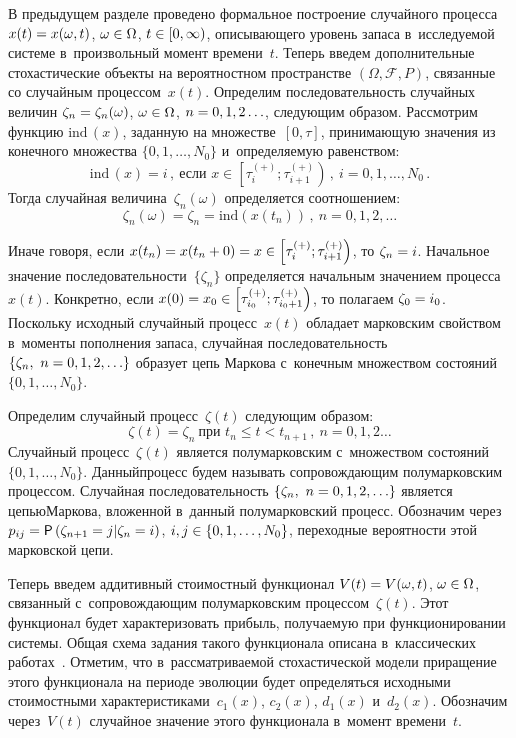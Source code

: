 \begin{multicols}{2}
  В предыдущем разделе проведено формальное построение случайного 
процесса $x(t)\hm= x(\omega, t)$, $\omega\hm\in \Omega$, $t\hm\in [0,\infty)$, 
описывающего уровень запаса в~исследуемой системе в~произвольный момент 
времени~$t$. Теперь введем дополнительные стохастические объекты на 
вероятностном пространстве $(\Omega, \mathcal{F}, P)$, связанные со 
случайным процессом~$x(t)$. Определим последовательность случайных 
величин $\zeta_n\hm= \zeta_n(\omega)$, $\omega\hm\in \Omega$, 
$n\hm=0,1,2\ldots$, следующим образом. Рассмотрим функцию $\mathrm{ind}\,(x)$, 
заданную на множестве~$[0,\tau]$, принимающую значения из конечного 
множества $\{0,1,\ldots ,N_0\}$ и~определяемую равенством:
  $$
  \mathrm{ind}\,(x) =i\,,\ \mbox{если } x\in \left[ \tau_i^{(+)}; 
  \tau_{i+1}^{(+)}\right)\,,\ i=0,1,\ldots, 
N_0\,.
  $$
    Тогда случайная величина~$\zeta_n(\omega)$ определяется соотношением:
  $$
  \zeta_n(\omega) =\zeta_n=\mathrm{ind}\left( x\left( t_n\right)\right)\,,\ n=0,1,2,\ldots
  $$
  
  Иначе говоря, если $x(t_n)\hm= x(t_n+0)\hm= x\hm\in \left[ \tau_i^{(+)}; 
\tau_{i+1}^{(+)}\right)$, то $\zeta_n\hm=i$. Начальное значение 
последовательности~$\{\zeta_n\}$ определяется начальным значением процесса 
$x(t)$. Конкретно, если $x(0)\hm= x_0\hm\in \left[ \tau^{(+)}_{i_0}; 
\tau^{(+)}_{i_0+1}\right)$, то полагаем $\zeta_0\hm=i_0$. Поскольку исходный 
случайный процесс~$x(t)$ обладает марковским свойством в~моменты 
пополнения запаса, случайная последовательность $\{\zeta_n,\ 
n\hm=0,1,2,\ldots\}$ образует цепь Маркова с~конечным множеством состояний 
$\{0,1,\ldots, N_0\}$. 

Определим случайный процесс~$\zeta(t)$ следующим 
образом:
  $$
  \zeta(t)=\zeta_n\ \mbox{при } t_n\leq t < t_{n+1}\,,\ n=0,1,2\ldots
  $$
    Случайный процесс~$\zeta(t)$ является полумарковским с~множеством 
состояний $\{0,1,\ldots ,N_0\}$. Данный\linebreak процесс будем называть 
сопровождающим по\-лу\-мар\-ковским процессом. Случайная последо\-ва\-тельность 
$\{\zeta_n,\ n\hm=0,1,2,\ldots\}$ является цепью\linebreak Маркова, вложенной в~данный 
полумарковский процесс. Обозначим через 
$p_{ij}\hm= {\sf P}\left( 
\zeta_{n+1}=j\vert \zeta_n=i\right)$, $i,j\hm\in \{0,1,\ldots, N_0\}$,
переходные 
вероятности этой марковской цепи.
  
  Теперь введем аддитивный стоимостный функционал $V(t)\hm= V(\omega, 
t)$, $\omega\hm\in \Omega$, связанный с~сопровождающим полумарковским 
процессом~$\zeta(t)$. Этот функционал будет характеризовать прибыль, 
получаемую при функционировании системы. Общая схема задания такого 
функционала описана в~классических работах~\cite{4-sh, 5-sh}. Отметим, что 
в~рассматриваемой стохастической модели приращение этого функционала на 
периоде эволюции будет определяться исходными стоимостными 
характеристиками~$c_1(x)$, $c_2(x)$, $d_1(x)$ и~$d_2(x)$. Обозначим 
через~$V(t)$ случайное значение этого функционала в~момент времени~$t$. 
  

\end{multicols}
